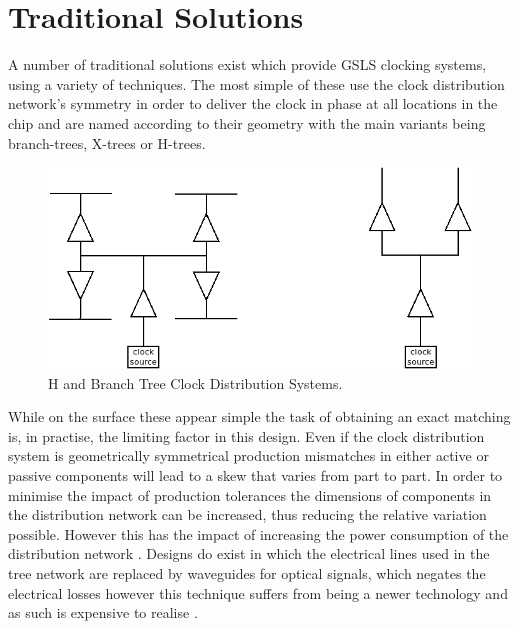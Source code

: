 \documentclass[11pt,english,british]{report}
\begin{document}
\section{Traditional Solutions}
A number of traditional solutions exist which provide GSLS clocking systems, using a variety of techniques. The most simple of these use the clock distribution network's symmetry in order to deliver the clock in phase at all locations in the chip and are named according to their geometry with the main variants being branch-trees, X-trees or H-trees. %
\begin{figure}[h]
	\centering
	\includegraphics[scale=0.3]{../trees}
	\caption{H and Branch Tree Clock Distribution Systems.}%
	\label{fig:trees}
\end{figure}
While on the surface these appear simple the task of obtaining an exact matching is, in practise, the limiting factor in this design. Even if the clock distribution system is geometrically symmetrical production mismatches in either active or passive components will lead to a skew that varies from part to part. In order to minimise the impact of production tolerances the dimensions of components in the distribution network can be increased, thus reducing the relative variation possible. However this has the impact of increasing the power consumption of the distribution network \cite{tiwari1998reducing}.
Designs do exist in which the electrical lines used in the tree network are replaced by waveguides for optical signals, which negates the electrical losses however this technique suffers from being a newer technology and as such is expensive to realise \cite{haurylau2006chip}.
\end{document}
